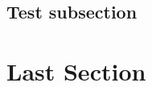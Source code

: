 \documentclass[a4paper,openany]{book}
\begin{document}
{\begin{multicols}{2}
\subsection{Test subsection}

\lipsum[2]

\elf


\lipsum[10]

\section{Last Section}

\lipsum[3]

\end{multicols}

}

\tableofcontents




\end{document}
